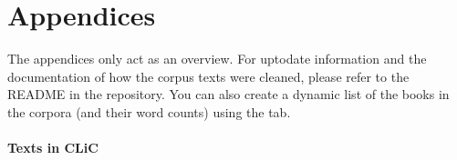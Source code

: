 \documentclass[letterpaper,10pt,english]{sphinxmanual}
\begin{document}
\appendix
{}\label{\detokenize{appendices::doc}}

\chapter{Appendices}
\label{\detokenize{appendices:appendices}}\label{\detokenize{appendices:a-list-of-texts-available-in-clic}}
\sphinxAtStartPar
The appendices only act as an overview. For up\sphinxhyphen{}to\sphinxhyphen{}date information and
the documentation of how the corpus texts were cleaned, please refer to
the README in the  repository. You can also create a
dynamic list of the books in the corpora (and their word counts) using
the {\hyperref[\detokenize{clicanalysis/counts:counts}]{}} tab.
\subsubsection*{Texts in CLiC}
\end{document}
